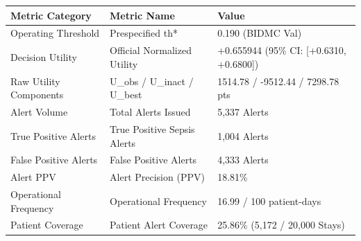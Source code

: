 \begin{tabular}{lll}
\toprule
Metric Category & Metric Name & Value \\
\midrule
Operating Threshold & Prespecified th* & 0.190 (BIDMC Val) \\
Decision Utility & Official Normalized Utility & +0.655944 (95\% CI: [+0.6310, +0.6800]) \\
Raw Utility Components & U_obs / U_inact / U_best & 1514.78 / -9512.44 / 7298.78 pts \\
Alert Volume & Total Alerts Issued & 5,337 Alerts \\
True Positive Alerts & True Positive Sepsis Alerts & 1,004 Alerts \\
False Positive Alerts & False Positive Alerts & 4,333 Alerts \\
Alert PPV & Alert Precision (PPV) & 18.81\% \\
Operational Frequency & Operational Frequency & 16.99 / 100 patient-days \\
Patient Coverage & Patient Alert Coverage & 25.86\% (5,172 / 20,000 Stays) \\
\bottomrule
\end{tabular}
